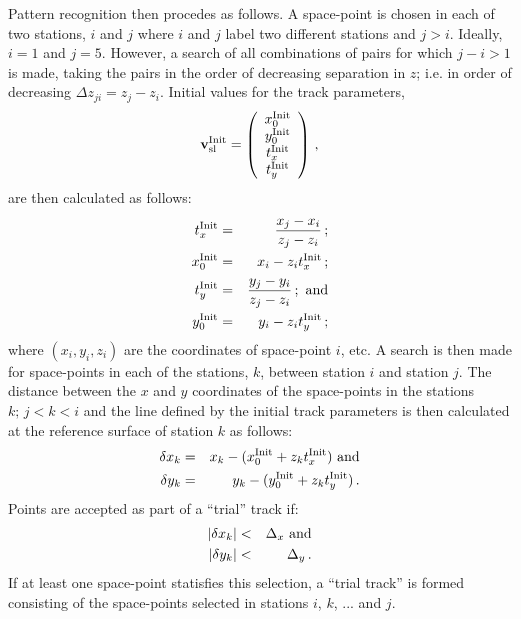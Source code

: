 Pattern recognition then procedes as follows.
A space-point is chosen in each of two stations, $i$ and $j$ where $i$
and $j$ label two different stations and $j>i$.
Ideally, $i=1$ and $j=5$.
However, a search of all combinations of pairs for which $j-i>1$ is
made, taking the pairs in the order of decreasing separation in $z$;
i.e. in order of decreasing $\Delta z_{ji} = z_j - z_i$. 
Initial values for the track parameters,
\begin{equation}
 {\bf v_{\rm sl}^{\rm Init}} =
 \left( 
   \begin{array}{c}
     x_0^{\rm Init} \\
     y_0^{\rm Init} \\
     t_x^{\rm Init} \\
     t_y^{\rm Init}
   \end{array}
 \right)\,,
\end{equation}
are then calculated as follows:
\begin{eqnarray}
  t_x^{\rm Init} & = & \frac{x_j - x_i}{z_j - z_i} \,;        \\
  x_0^{\rm Init} & = & x_i - z_i t_x^{\rm Init}      \,;        \\
  t_y^{\rm Init} & = & \frac{y_j - y_i}{z_j - z_i} \,; {\rm~and} \\
  y_0^{\rm Init} & = & y_i - z_i t_y^{\rm Init} \,;
\end{eqnarray}
where $(x_i, y_i, z_i)$ are the coordinates of space-point $i$, etc.
A search is then made for space-points in each of the stations, $k$,
between station $i$ and station $j$.
The distance between the $x$ and $y$ coordinates of the space-points
in the stations $k;\,j<k<i$ and the line defined by the initial track
parameters is then calculated at the reference surface of station $k$
as follows:
\begin{eqnarray}
  \delta x_k & = & x_k - (x_0^{\rm Init} + z_k t_x^{\rm Init}) {\rm~and} \\
  \delta y_k & = & y_k - (y_0^{\rm Init} + z_k t_y^{\rm Init}) \,.
\end{eqnarray}
Points are accepted as part of a ``trial'' track if:
\begin{eqnarray}
  | \delta x_k | & < & \Delta_x {\rm~and} \\
  | \delta y_k | & < & \Delta_y \,.
\end{eqnarray}
If at least one space-point statisfies this selection, a ``trial track''
is formed consisting of the space-points selected in stations 
$i$, $k$, ... and $j$.

